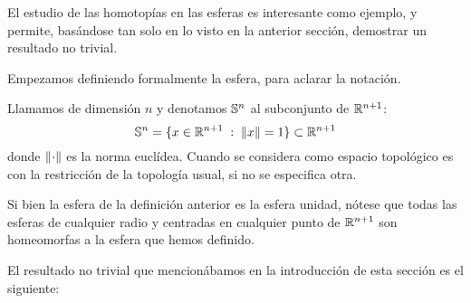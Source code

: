 El estudio de las homotopías en las esferas es interesante como ejemplo, y permite, basándose tan solo en lo visto en la anterior sección, demostrar un resultado no trivial.

Empezamos definiendo formalmente la esfera, para aclarar la notación.

\begin{defi}[Esfera]
	Llamamos  de dimensión $n$ y denotamos $\mathbb{S}^n$ al subconjunto de $\mathbb{R}^{n+1}$:
	\[\mathbb{S}^n = \{x\in\mathbb{R}^{n+1}\;:\; \lVert x\rVert=1\}\subset\mathbb{R}^{n+1}\]
	donde $\lVert\cdot\rVert$ es la norma euclídea. Cuando se considera como espacio topológico es con la restricción de la topología usual, si no se especifica otra.
\end{defi}

\begin{obs}
	Si bien la esfera de la definición anterior es la esfera unidad, nótese que todas las esferas de cualquier radio y centradas en cualquier punto de $\mathbb{R}^{n+1}$ son homeomorfas a la esfera que hemos definido.
\end{obs}

El resultado no trivial que mencionábamos en la introducción de esta sección es el siguiente:


